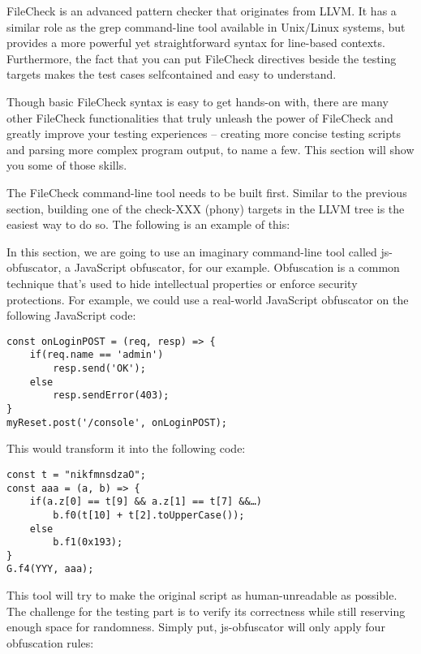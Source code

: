 
FileCheck is an advanced pattern checker that originates from LLVM. It has a similar role as the grep command-line tool available in Unix/Linux systems, but provides a more powerful yet straightforward syntax for line-based contexts. Furthermore, the fact that
you can put FileCheck directives beside the testing targets makes the test cases selfcontained and easy to understand.

Though basic FileCheck syntax is easy to get hands-on with, there are many other FileCheck functionalities that truly unleash the power of FileCheck and greatly improve your testing experiences – creating more concise testing scripts and parsing more complex program output, to name a few. This section will show you some of those skills.


The FileCheck command-line tool needs to be built first. Similar to the previous section, building one of the check-XXX (phony) targets in the LLVM tree is the easiest way to do so. The following is an example of this:


In this section, we are going to use an imaginary command-line tool called js-obfuscator, a JavaScript obfuscator, for our example. Obfuscation is a common technique that's used to hide intellectual properties or enforce security protections. For example, we could use a real-world JavaScript obfuscator on the following JavaScript code:

\begin{lstlisting}[style=styleJavaScript]
const onLoginPOST = (req, resp) => {
	if(req.name == 'admin')
		resp.send('OK');
	else
		resp.sendError(403);
}
myReset.post('/console', onLoginPOST);
\end{lstlisting}

This would transform it into the following code:

\begin{lstlisting}[style=styleJavaScript]
const t = "nikfmnsdzaO";
const aaa = (a, b) => {
	if(a.z[0] == t[9] && a.z[1] == t[7] &&…)
		b.f0(t[10] + t[2].toUpperCase());
	else
		b.f1(0x193);
}
G.f4(YYY, aaa);
\end{lstlisting}

This tool will try to make the original script as human-unreadable as possible. The challenge for the testing part is to verify its correctness while still reserving enough space for randomness. Simply put, js-obfuscator will only apply four obfuscation rules:

